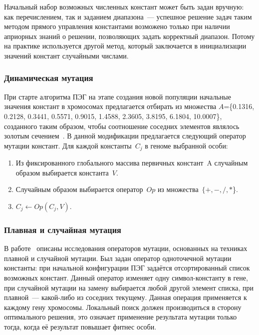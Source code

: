 Начальный набор возможных численных констант может быть задан вручную: как перечислением, так и заданием диапазона~--- успешное решение задач таким методом прямого управления константами возможено только при наличии априорных знаний о решении, позволяющих задать корректный диапазон. Потому на практике используется другой метод, который заключается в инициализации значений констант случайными числами.


\subsubsection{Динамическая мутация}

При старте алгоритма ПЭГ на этапе создания новой популяции начальные значения констант в хромосомах предлагается отбирать из множества $A$=\{0.1316, 0.2128, 0.3441, 0.5571, 0.9015, 1.4588, 2.3605, 3.8195, 6.1804, 10.0007\}, созданного таким образом, чтобы соотношение соседних элементов являлось золотым сечением~\cite{Peng:2007:FFC:1304604.1305824}. В данной модификации предлагается следующий оператор мутации констант. Для каждой константы~$C_j$ в геноме выбранной особи:
\begin{enumerate}
  \item Из фиксированного глобального массива первичных констант~A случайным образом выбирается константа~$V$.
  \item Случайным образом выбирается оператор~$Op$ из множества~$\{+, -, /, *$\}.
  \item $C_j \leftarrow Op(C_j, V)$.
\end{enumerate}


\subsubsection{Плавная и случайная мутация}

В работе~\cite{li:2004:lbp} описаны исследования операторов мутации, основанных на техниках плавной и случайной мутации. Был задан оператор одноточечной мутации константы: при начальной конфигурации ПЭГ задаётся отсортированный список возможных констант. Данный оператор изменяет одну символ-константу в гене, при случайной мутации на замену выбирается любой другой элемент списка, при плавной~--- какой-либо из соседних текущему. Данная операция применяется к каждому гену хромосомы. Локальный поиск должен производиться в сторону оптимального решения, это означает применение результата мутации только тогда, когда её результат повышает фитнес особи.

